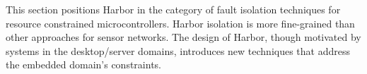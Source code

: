 % 
% 



%
This section positions Harbor in the category of fault isolation
techniques for
resource constrained microcontrollers.
%
Harbor isolation is more fine-grained than other approaches for sensor
networks.
%
The design of Harbor, though motivated by systems in the
desktop/server domains, introduces new techniques that address the
embedded domain's constraints.
%

